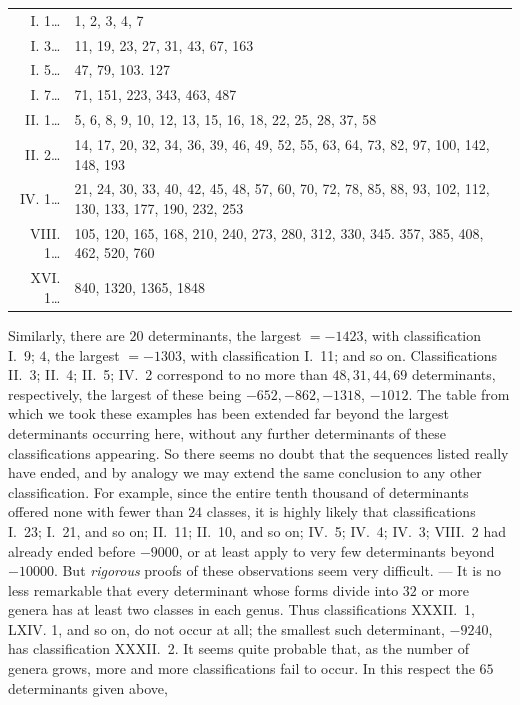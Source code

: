 \begin{center}\begin{tabularx}{\textwidth}{@{}r@{\quad}X@{}}
I. 1\;\ldots & 1, 2, 3, 4, 7\\[2pt]
I. 3\;\ldots & 11, 19, 23, 27, 31, 43, 67, 163\\[2pt]
I. 5\;\ldots & 47, 79, 103. 127\\[2pt]
I. 7\;\ldots & 71, 151, 223, 343, 463, 487\\[2pt]
II. 1\;\ldots & 5, 6, 8, 9, 10, 12, 13, 15, 16, 18, 22, 25, 28, 37, 58\\[2pt]
II. 2\;\ldots & 14, 17, 20, 32, 34, 36, 39, 46, 49, 52, 55, 63, 64, 73, 82, 97, 100, 142, 148, 193\\[2pt]
IV. 1\;\ldots & 21, 24, 30, 33, 40, 42, 45, 48, 57, 60, 70, 72, 78, 85, 88, 93, 102, 112, 130, 133, 177, 190, 232, 253\\[2pt]
VIII. 1\;\ldots & 105, 120, 165, 168, 210, 240, 273, 280, 312, 330, 345. 357, 385, 408, 462, 520, 760\\[2pt]
XVI. 1\;\ldots & 840, 1320, 1365, 1848\\[2pt]
\end{tabularx}\end{center}
Similarly, there are \(20\) determinants, the largest \(=-1423\), with classification I.~9; \(4\), the largest \(=-1303\), with classification I.~11; and so on. Classifications II.~3; II.~4; II.~5; IV.~2 correspond to no more than \(48,31,44,69\) determinants, respectively, the largest of these being \(-652,-862,-1318\), \(-1012\). The table from which we took these examples has been extended far beyond the largest determinants occurring here, without any further determinants of these classifications appearing. So there seems no doubt that the sequences listed really have ended, and by analogy we may extend the same conclusion to any other classification. For example, since the entire tenth thousand of determinants offered none with fewer than \(24\) classes, it is highly likely that classifications I.~23; I.~21, and so on; II.~11; II.~10, and so on; IV.~5; IV.~4; IV.~3; VIII.~2 had already ended before \(-9000\), or at least apply to very few determinants beyond \(-10000\). But \textit{rigorous} proofs of these observations seem very difficult. — It is no less remarkable that every determinant whose forms divide into \(32\) or more genera has at least two classes in each genus. Thus classifications XXXII.~1, LXIV. 1, and so on, do not occur at all; the smallest such determinant, \(-9240\), has classification XXXII.~2. It seems quite probable that, as the number of genera grows, more and more classifications fail to occur. In this respect the \(65\) determinants given above,
